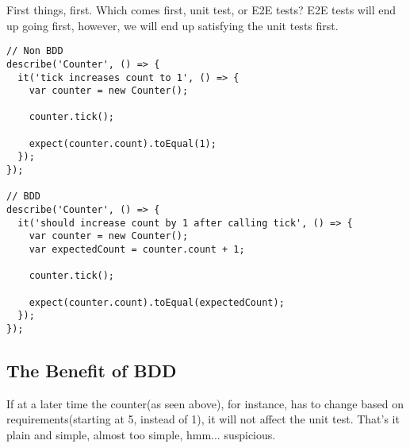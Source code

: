 First things, first. Which comes first, unit test, or E2E tests? E2E tests will
end up going first, however, we will end up satisfying the unit tests first.

\begin{lstlisting}
// Non BDD
describe('Counter', () => {
  it('tick increases count to 1', () => {
    var counter = new Counter();

    counter.tick();

    expect(counter.count).toEqual(1);
  });
});

// BDD
describe('Counter', () => {
  it('should increase count by 1 after calling tick', () => {
    var counter = new Counter();
    var expectedCount = counter.count + 1;

    counter.tick();

    expect(counter.count).toEqual(expectedCount);
  });
});
\end{lstlisting}

\subsection{ The Benefit of BDD }
If at a later time the counter(as seen above), for instance, has to change
based on requirements(starting at 5, instead of 1), it will not affect the unit
test. That's it plain and simple, almost too simple, hmm... suspicious.

